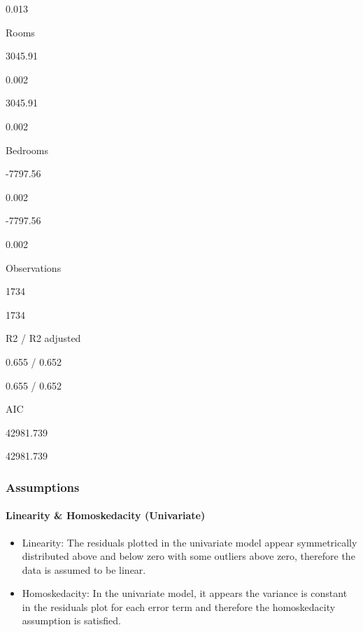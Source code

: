 \documentclass[letterpaper,9pt,twocolumn,twoside,]{pinp}
\begin{document}
0.013

Rooms

3045.91

0.002

3045.91

0.002

Bedrooms

-7797.56

0.002

-7797.56

0.002

Observations

1734

1734

R2 / R2 adjusted

0.655 / 0.652

0.655 / 0.652

AIC

42981.739

42981.739

\hypertarget{assumptions}{%
\subsubsection{Assumptions}\label{assumptions}}

\hypertarget{linearity-homoskedacity-univariate}{%
\paragraph{Linearity \& Homoskedacity
(Univariate)}\label{linearity-homoskedacity-univariate}}

\begin{itemize}
\item
  Linearity: The residuals plotted in the univariate model appear
  symmetrically distributed above and below zero with some outliers
  above zero, therefore the data is assumed to be linear.
\item
  Homoskedacity: In the univariate model, it appears the variance is
  constant in the residuals plot for each error term and therefore the
  homoskedacity assumption is satisfied.
\end{itemize}
\end{document}
